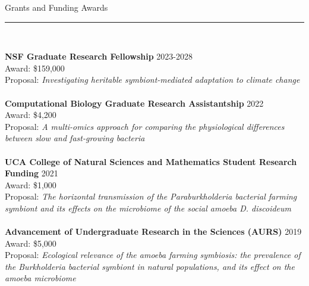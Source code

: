 \documentclass{article}
\begin{document}
\begin{flushleft}
{\Large Grants and Funding Awards} \rule{16.51cm}{0.4pt}\\
\end{flushleft}
\textbf{NSF Graduate Research Fellowship} \hfill 2023-2028\\
Award: \$159,000\\
Proposal: \emph{Investigating heritable symbiont-mediated adaptation to climate change}\\
\pagebreak
\\
\textbf{Computational Biology Graduate Research Assistantship} \hfill 2022\\
Award: \$4,200\\
Proposal: \emph{A multi-omics approach for comparing the physiological differences between slow and fast-growing bacteria}\\
\\
\textbf{UCA College of Natural Sciences and Mathematics Student Research Funding} \hfill 2021\\
Award: \$1,000\\
Proposal: \emph{The horizontal transmission of the Paraburkholderia bacterial farming symbiont and its effects on the microbiome of the social amoeba D. discoideum}\\
\\
\textbf{Advancement of Undergraduate Research in the Sciences (AURS)} \hfill 2019\\
Award: \$5,000\\
Proposal: \emph{Ecological relevance of the amoeba farming symbiosis: the prevalence of the Burkholderia bacterial symbiont in natural populations, and its effect on the amoeba microbiome}
\\
\end{document}
